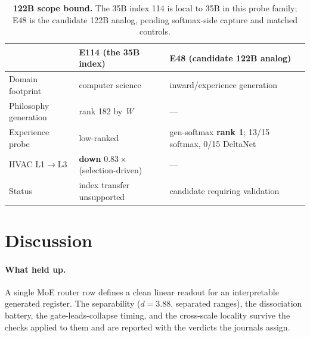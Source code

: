 \documentclass[10pt,a4paper,twocolumn]{article}
\newcommand{\W}{\textit{W}}
\begin{document}
\begin{table}[t]
\small
\centering
\begin{tabularx}{0.96\textwidth}{l X X}
\toprule
 & \textbf{E114 (the 35B index)} & \textbf{E48 (candidate 122B analog)} \\
\midrule
Domain footprint        & computer science                  & inward/experience generation \\
Philosophy generation   & rank 182 by \W{}                  & --- \\
Experience probe        & low-ranked                        & gen-softmax \textbf{rank 1}; 13/15 softmax, 0/15 DeltaNet \\
HVAC L1$\rightarrow$L3   & \textbf{down} $0.83\times$ (selection-driven) & --- \\
Status                  & index transfer unsupported         & candidate requiring validation \\
\bottomrule
\end{tabularx}
\caption{\textbf{122B scope bound.} The 35B index 114 is local to 35B in this
probe family; E48 is the candidate 122B analog, pending softmax-side capture and
matched controls.}
\label{tab:transfer}
\end{table}

\section{Discussion}\label{sec:disc}

\paragraph{What held up.}
A single MoE router row defines a clean linear readout for an interpretable generated
register. The separability ($d{=}3.88$, separated ranges), the dissociation battery, the
gate-leads-collapse timing, and the cross-scale locality survive the checks
applied to them and are reported with the verdicts the journals assign.
\end{document}
